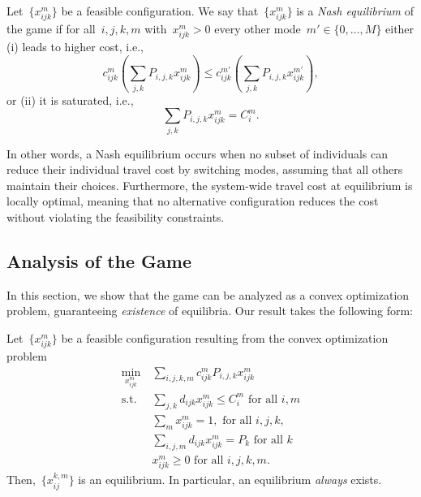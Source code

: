 \begin{definition}
Let~$\{x_{ijk}^{m}\}$ be a feasible configuration.
We say that~$\{x_{ijk}^m\}$ is a \emph{Nash equilibrium} of the game if for all~$i,j,k,m$ with~$x_{ijk}^{m}>0$ every other mode~$m'\in\{0,\ldots,M\}$ either (i) leads to higher cost, i.e., 
\begin{equation*}
c_{ijk}^m\left(\sum_{j,k}  P_{i,j, k} x_{ijk}^m\right)
    \leq 
c_{ijk}^{m'}\left(\sum_{j,k}  P_{i,j,k} x_{ijk}^{m'}\right),
\end{equation*}
or (ii) it is saturated, i.e., 
\begin{equation*}
    \sum_{j,k}  P_{i,j,k} x_{ijk}^m = C_{i}^m.
\end{equation*}
\end{definition}

In other words, a Nash equilibrium occurs when no subset of individuals can reduce their individual travel cost by switching modes, assuming that all others maintain their choices.
Furthermore, the system-wide travel cost at equilibrium is locally optimal, meaning that no alternative configuration reduces the cost without violating the feasibility constraints.

\subsection{Analysis of the Game}
In this section, we show that the game can be analyzed as a convex optimization problem, guaranteeing \emph{existence} of equilibria. Our result takes the following form:

\begin{theorem}\label{thm:equilibria}
Let~$\{x_{ijk}^{m}\}$ be a feasible configuration resulting from the convex optimization problem
\begin{subequations}\label{eq:optimization}
\begin{align}
    \min_{x_{ijk}^m}\: &
    \sum_{i,j,k,m} c_{ijk}^m  P_{i,j,k} x_{ijk}^m 
    \\
    \mathrm{s.t. }\: &
    \sum_{j,k} d_{ijk} x_{ijk}^m \leq C_{i}^m \text{ for all }i,m
    \\
    & \sum_{m}x_{ijk}^m=1, \text{ for all }i,j,k, 
    \\
    & \sum_{i,j,m} d_{ijk}x_{ijk}^m=P_k \text{ for all }k
    \\
    &x_{ijk}^m\geq 0 \text{ for all }i,j,k,m.
\end{align}
\end{subequations}
Then,~$\{x_{ij}^{k,m}\}$ is an equilibrium. 
In particular, an equilibrium \emph{always} exists.
\end{theorem}

